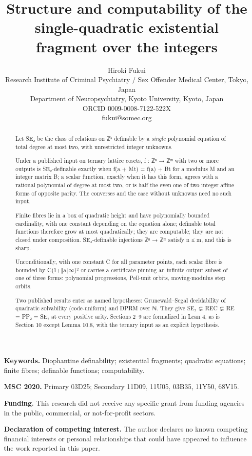 \title{Structure and computability of the single-quadratic existential fragment over the integers}
\author{Hiroki Fukui\\ \small Research Institute of Criminal Psychiatry / Sex Offender Medical Center, Tokyo, Japan\\ \small Department of Neuropsychiatry, Kyoto University, Kyoto, Japan\\ \small ORCID 0009-0008-7122-522X\\ \small fukui@somec.org}
\date{}
\maketitle
\linenumbers
\begin{abstract}
Let SE₂ be the class of relations on ℤᵏ definable by a \emph{single} polynomial equation of total degree at most two, with unrestricted integer unknowns.

Under a published input on ternary lattice cosets, f : ℤⁿ → ℤᵐ with two or more outputs is SE₂-definable exactly when f(a + Mt) = f(a) + Bt for a modulus M and an integer matrix B; a scalar function, exactly when it has this form, agrees with a rational polynomial of degree at most two, or is half the even one of two integer affine forms of opposite parity. The converses and the case without unknowns need no such input.

Finite fibres lie in a box of quadratic height and have polynomially bounded cardinality, with one constant depending on the equation alone; definable total functions therefore grow at most quadratically; they are computable; they are not closed under composition. SE₂-definable injections ℤⁿ → ℤᵐ satisfy n ≤ m, and this is sharp.

Unconditionally, with one constant C for all parameter points, each scalar fibre is bounded by C(1+‖a‖∞)² or carries a certificate pinning an infinite output subset of one of three forms: polynomial progressions, Pell-unit orbits, moving-modulus step orbits.

Two published results enter as named hypotheses: Grunewald–Segal decidability of quadratic solvability (code-uniform) and DPRM over ℕ. They give SE₂ ⊊ REC ⊊ RE = PP₂ = SE₄ at every positive arity. Sections 2–9 are formalized in Lean 4, as is Section 10 except Lemma 10.8, with the ternary input as an explicit hypothesis.

\end{abstract}
\noindent\textbf{Keywords.} Diophantine definability; existential fragments; quadratic equations; finite fibres; definable functions; computability.

\noindent\textbf{MSC 2020.} Primary 03D25; Secondary 11D09, 11U05, 03B35, 11Y50, 68V15.

\noindent\textbf{Funding.} This research did not receive any specific grant from funding agencies in the public, commercial, or not-for-profit sectors.

\noindent\textbf{Declaration of competing interest.} The author declares no known competing financial interests or personal relationships that could have appeared to influence the work reported in this paper.

